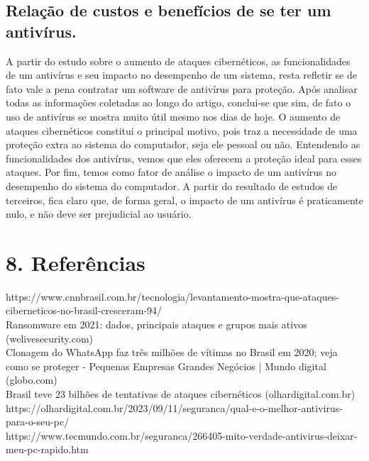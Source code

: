 \documentclass[10pt,conference,twocolumn]{article}
\begin{document}
\subsection*{Relação de custos e benefícios de se ter um antivírus.}
A partir do estudo sobre o aumento de ataques cibernéticos, as funcionalidades de um antivírus e seu impacto no desempenho de um sistema, resta refletir se de fato vale a pena contratar um software de antivírus para proteção. \newline
Após analisar todas as informações coletadas ao longo do artigo, conclui-se que sim, de fato o uso de antivírus se mostra muito útil mesmo nos dias de hoje. O aumento de ataques cibernéticos constitui o principal motivo, pois traz a necessidade de uma proteção extra ao sistema do computador, seja ele pessoal ou não. Entendendo as funcionalidades dos antivírus, vemos que eles oferecem a proteção ideal para esses ataques.\newline
Por fim, temos como fator de análise o impacto de um antivírus no desempenho do sistema do computador. A partir do resultado de estudos de terceiros, fica claro que, de forma geral, o impacto de um antivírus é praticamente nulo, e não deve ser prejudicial ao usuário.


\section* {8. Referências}

https://www.cnnbrasil.com.br/tecnologia/levantamento-mostra-que-ataques-ciberneticos-no-brasil-cresceram-94/ \\

Ransomware em 2021: dados, principais ataques e grupos mais ativos (welivesecurity.com)\\

Clonagem do WhatsApp faz três milhões de vítimas no Brasil em 2020; veja como se proteger - Pequenas Empresas Grandes Negócios | Mundo digital (globo.com)\\

Brasil teve 23 bilhões de tentativas de ataques cibernéticos (olhardigital.com.br)\\

https://olhardigital.com.br/2023/09/11/seguranca/qual-e-o-melhor-antivirus-para-o-seu-pc/\\

https://www.tecmundo.com.br/seguranca/266405-mito-verdade-antivirus-deixar-meu-pc-rapido.htm\\
\end{document}
